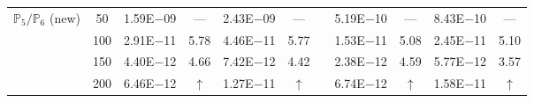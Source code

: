 \begin{table}[H]
{\begin{tabular}{@{}l c c c c c c c c c c@{}}
 \midrule
 \multirow{4}{*}{$\mathbb{P}_{5}/\mathbb{P}_{6}$ (new)}
 & 50 & 1.59E$-$09 & ---  & 2.43E$-$09 & --- &  & 5.19E$-$10 & --- & 8.43E$-$10 & ---\\
 & 100 & 2.91E$-$11 & 5.78  & 4.46E$-$11 & 5.77 &  & 1.53E$-$11 & 5.08 & 2.45E$-$11 & 5.10\\
 & 150 & 4.40E$-$12 & 4.66  & 7.42E$-$12 & 4.42 &  & 2.38E$-$12 & 4.59 & 5.77E$-$12 & 3.57\\
 & 200 & 6.46E$-$12 & $\uparrow$  & 1.27E$-$11 & $\uparrow$ &  & 6.74E$-$12 & $\uparrow$ & 1.58E$-$11 & $\uparrow$\\
\bottomrule
\end{tabular}}
\label{none}
\end{table}
